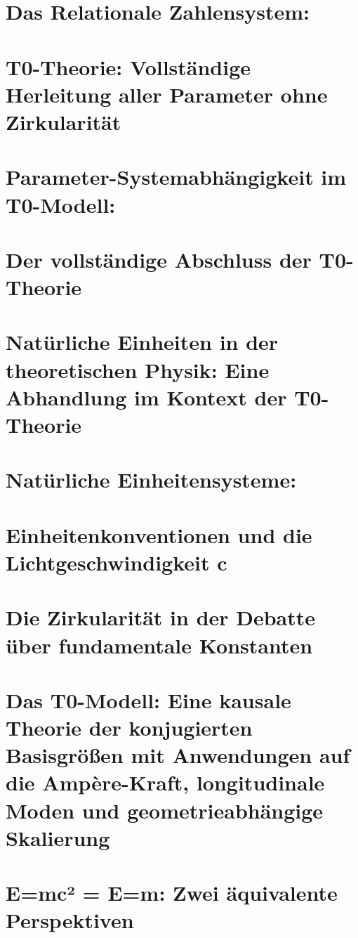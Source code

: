 	\chapter{Das Relationale Zahlensystem:}
	
	\chapter{T0-Theorie: Vollständige Herleitung aller Parameter ohne Zirkularität}
	
	\chapter{Parameter-Systemabhängigkeit im T0-Modell:}
	
	\chapter{Der vollständige Abschluss der T0-Theorie}
	
	\chapter{Natürliche Einheiten in der theoretischen Physik: Eine Abhandlung im Kontext der T0-Theorie}
	
	\chapter{Natürliche Einheitensysteme:}
	
	\chapter{Einheitenkonventionen und die Lichtgeschwindigkeit c}
	
	\chapter{Die Zirkularität in der Debatte über fundamentale Konstanten}
	
	\chapter{Das T0-Modell: Eine kausale Theorie der konjugierten Basisgrößen mit Anwendungen auf die Ampère-Kraft, longitudinale Moden und geometrieabhängige Skalierung}
	
	\chapter{E=mc² = E=m: Zwei äquivalente Perspektiven}
	
